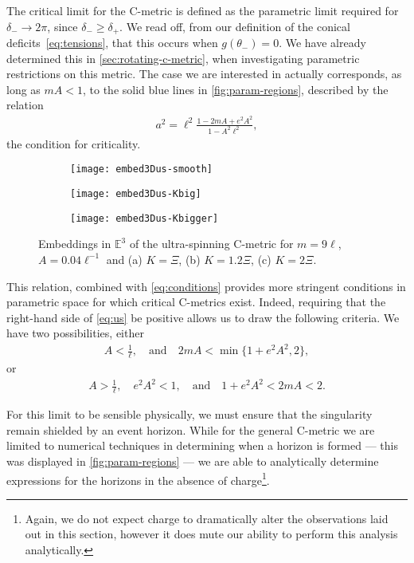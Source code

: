 \documentclass[
twoside,
openright,
frontopenright,
]{dmathesis}
\begin{document}
The critical limit for the C-metric is defined as the parametric limit required
for $\delta_- \to 2\pi$, since $\delta_-\geqslant \delta_+$. We read off, from
our definition of the conical deficits~\eqref{eq:tensions}, that this occurs
when $g(\theta_-)=0$. We have already determined this in
\cref{sec:rotating-c-metric}, when investigating parametric restrictions on this
metric. The case we are interested in actually corresponds, as long as $mA < 1$,
to the solid blue lines in \cref{fig:param-regions}, described by the relation
\begin{align}\label{eq:us}
a^2 = \ell^2 \frac{1-2mA+e^2A^2}{1-A^2\ell^2},
\end{align}
the condition for criticality.


\begin{figure}
\centering
\begin{subfigure}[b]{0.2\textwidth}
\texttt{[image: embed3Dus-smooth]}
\caption{\label{fig:embed3Dus-smooth}}
\end{subfigure}\qquad
\begin{subfigure}[b]{0.2\textwidth}
\texttt{[image: embed3Dus-Kbig]}
\caption{\label{fig:embed3Dus-Kbig}}
\end{subfigure}\qquad
\begin{subfigure}[b]{0.2\textwidth}
\texttt{[image: embed3Dus-Kbigger]}
\caption{\label{fig:embed3Dus-Kbigger}}
\end{subfigure}
\caption{\label{fig:embed3Dus}Embeddings in $\mathbb{E}^3$ of the ultra-spinning
  C-metric for $m=9\ell$, $A=0.04\ell^{-1}$ and (a) $K=\Xi$, (b) $K=1.2\Xi$, (c)
  $K=2\Xi$.} 
\end{figure}

This relation, combined with \cref{eq:conditions} provides more stringent
conditions in parametric space for which critical C-metrics exist. Indeed,
requiring that the right-hand side of \cref{eq:us} be positive allows us to draw
the following criteria. We have two possibilities, either
\begin{align}\label{eq:case1}
A<\frac{1}{\ell},\quad \mbox{and}\quad 2mA<\min \{1+e^2A^2,2\},
\end{align}
or
\begin{align}\label{eq:case2}
A>\frac{1}{\ell}, \quad e^2A^2<1, \quad \mbox{and} \quad 1+e^2A^2<2mA<2.
\end{align}

For this limit to be sensible physically, we must ensure that the singularity
remain shielded by an event horizon. While for the general C-metric we are
limited to numerical techniques in determining when a horizon is formed --- this
was displayed in \cref{fig:param-regions} --- we are able to analytically
determine expressions for the horizons in the absence of charge\footnote{Again,
  we do not expect charge to dramatically alter the observations laid out in
  this section, however it does mute our ability to perform this analysis
  analytically.}.
\end{document}
